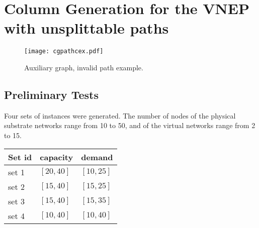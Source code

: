 \section{Column Generation for the VNEP with unsplittable paths}

\begin{figure}[h]
  \centering
  \texttt{[image: cgpathcex.pdf]}
  \caption{Auxiliary graph, invalid path example.}\label{fig:auxcex}
\end{figure}

\subsection{Preliminary Tests}
Four sets of instances were generated. The number of nodes of the physical substrate networks range from 10 to 50, and of the virtual networks range from 2 to 15.

\begin{center}
\begin{tabular}{l l l}
Set id    & capacity    & demand      \\
\hline
set 1     & $[20,40]$ & $[10,25]$   \\
set 2     & $[15,40]$ & $[15,25]$   \\
set 3     & $[15,40]$ & $[15,35]$   \\
set 4     & $[10,40]$ & $[10,40]$   \\
\end{tabular}
\end{center}

